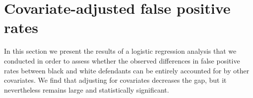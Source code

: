 \documentclass[11pt, svgnames]{article}
\numberwithin{equation}{section}
\theoremstyle{plain}
\theoremstyle{definition}
\numberwithin{prop}{section}
\numberwithin{corollary}{section}
\begin{document}
%
%
%
%
 
 
\section{Covariate-adjusted false positive rates} \label{appendix:logistic}

In this section we present the results of a logistic regression analysis that we conducted in order to assess whether the observed differences in false positive rates between black and white defendants can be entirely accounted for by other covariates.  We find that adjusting for covariates decreases the gap, but it nevertheless remains large and statistically significant.  
\end{document}
